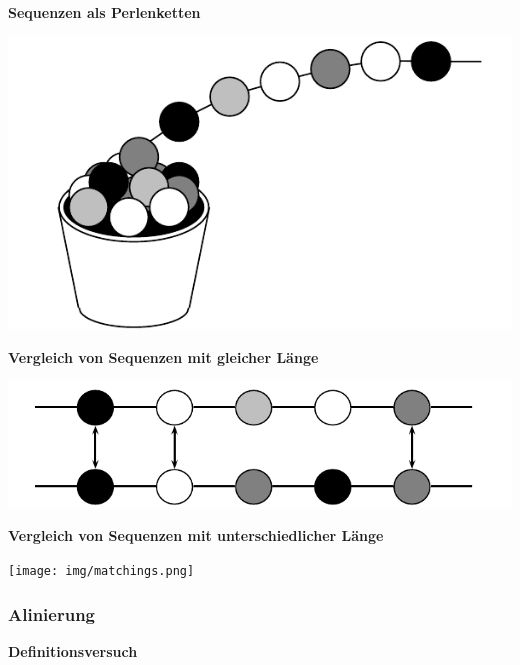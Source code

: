 \vspace{0.5cm}\par\noindent\textbf{Sequenzen als Perlenketten}\vspace{0.5cm}

\includegraphics[width=\textwidth]{img/kette.pdf}


\vspace{0.5cm}\par\noindent\textbf{Vergleich von Sequenzen mit gleicher Länge}\vspace{0.5cm}

\includegraphics[width=\textwidth]{img/hamming.pdf}



\vspace{0.5cm}\par\noindent\textbf{Vergleich von Sequenzen mit unterschiedlicher Länge}\vspace{0.5cm}

\texttt{[image: img/matchings.png]}


\subsubsection{\texorpdfstring{{Alinierung}}{Alinierung}}

\vspace{0.5cm}\par\noindent\textbf{Definitionsversuch}\vspace{0.5cm}

